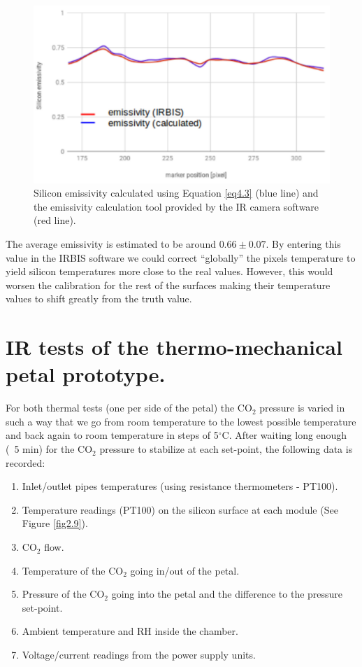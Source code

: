 		\begin{figure}[ht!]
			\centering
			\captionsetup{justification=centering,margin=2cm}
			\includegraphics[scale=0.35]{Figures/Chapter04/SiliconEmissivityCalculatedVSIRBIS.jpg}
			\caption{Silicon emissivity calculated using Equation \ref{eq4.3} (blue line) and the emissivity calculation tool provided by the IR camera software (red line).}\label{fig4.5}
		\end{figure}
		
		The average emissivity is estimated to be around $0.66 \pm 0.07$. By entering this value in the IRBIS software we could correct “globally” the pixels temperature to yield silicon temperatures more close to the real values. However, this would worsen the calibration for the rest of the surfaces making their temperature values to shift greatly from the truth value.\bigskip
		
	\section{IR tests of the thermo-mechanical petal prototype.}\label{section4.3}
		
		For both thermal tests (one per side of the petal) the CO$_{2}$ pressure is varied in such a way that we go from room temperature to the lowest possible temperature and back again to room temperature in steps of 5$^{\circ}$C. After waiting long enough (~5 min) for the CO$_{2}$ pressure to stabilize at each set-point, the following data is recorded:
		
		\begin{enumerate}[label={\arabic*)}]
			\item Inlet/outlet pipes temperatures (using resistance thermometers - PT100).
			\item Temperature readings (PT100) on the silicon surface at each module (See Figure \ref{fig2.9}).
			\item CO$_{2}$ flow.
			\item Temperature of the CO$_{2}$ going in/out of the petal.
			\item Pressure of the CO$_{2}$ going into the petal and the difference to the pressure set-point.
			\item Ambient temperature and RH inside the chamber.
			\item Voltage/current readings from the power supply units.
		\end{enumerate}
		
